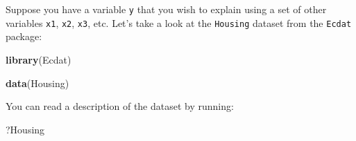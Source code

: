 \documentclass[]{gitbook}
\newenvironment{Shaded}{\begin{snugshade}}{\end{snugshade}}
\newcommand{\KeywordTok}[1]{\textcolor[rgb]{0.13,0.29,0.53}{\textbf{#1}}}
\newcommand{\NormalTok}[1]{#1}
\theoremstyle{definition}
\theoremstyle{definition}
\theoremstyle{definition}
\theoremstyle{remark}
\begin{document}
Suppose you have a variable \texttt{y} that you wish to explain using a
set of other variables \texttt{x1}, \texttt{x2}, \texttt{x3}, etc. Let's
take a look at the \texttt{Housing} dataset from the \texttt{Ecdat}
package:

\begin{Shaded}
\begin{Highlighting}[]
\KeywordTok{library}\NormalTok{(Ecdat)}

\KeywordTok{data}\NormalTok{(Housing)}
\end{Highlighting}
\end{Shaded}

You can read a description of the dataset by running:

\begin{Shaded}
\begin{Highlighting}[]
\NormalTok{?Housing}
\end{Highlighting}
\end{Shaded}
\end{document}
